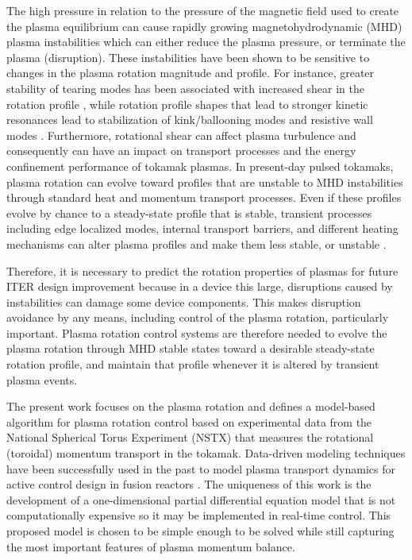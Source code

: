 \documentclass[12pt]{iopart}
\begin{document}
The high pressure in relation to the pressure of the magnetic field used to create the plasma equilibrium can cause rapidly growing magnetohydrodynamic (MHD) plasma instabilities which can either reduce the plasma pressure, or terminate the plasma (disruption). 
These instabilities have been shown to be sensitive to changes in the plasma rotation magnitude and profile. For instance, greater stability of tearing modes has been associated with increased shear in the rotation profile \cite{Gerhardt09, Park13}, while rotation profile shapes that lead to stronger kinetic resonances lead to stabilization of kink/ballooning modes and resistive wall modes \cite{Sabbagh10, Berkery10}. Furthermore, rotational shear can affect plasma turbulence and consequently can have an impact on transport processes and the energy confinement performance of tokamak plasmas. In present-day pulsed tokamaks, plasma rotation can evolve toward profiles that are unstable to MHD instabilities through standard heat and momentum transport processes. Even if these profiles evolve by chance to a steady-state profile that is stable, transient processes including edge localized modes, internal transport barriers, and different heating mechanisms can alter plasma profiles and make them less stable, or unstable \cite{Goumiri13}.

Therefore, it is necessary to predict the rotation properties of plasmas for future ITER design improvement  because in a device this large, disruptions caused by instabilities can damage some device components. This makes disruption avoidance by any means, including control of the plasma rotation, particularly important. Plasma rotation control systems are therefore needed to evolve the plasma rotation through MHD stable states toward a desirable steady-state rotation profile, and maintain that profile whenever it is altered by transient plasma events.

The present work focuses on the plasma rotation  and defines a model-based algorithm for plasma rotation control based on experimental data from the National Spherical Torus Experiment (NSTX) \cite{Ono00} that measures the rotational (toroidal) momentum transport in the tokamak. Data-driven modeling techniques have been successfully used in the past to model plasma transport dynamics for active control design in fusion reactors \cite{Moreau13, Boyer133, Boyer144}. The uniqueness of this work is the development of a one-dimensional partial differential equation model that is not computationally expensive so it may be implemented in real-time control.  
 This proposed model is chosen to be simple enough to be solved while still capturing the most important features of plasma momentum balance.
 
\end{document}
